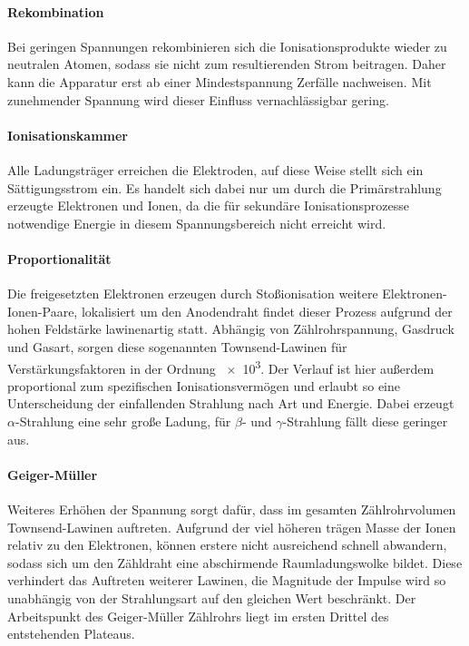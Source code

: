\paragraph{Rekombination}

Bei geringen Spannungen rekombinieren sich die Ionisationsprodukte wieder zu neutralen Atomen, sodass sie nicht zum resultierenden Strom beitragen.
Daher kann die Apparatur erst ab einer Mindestspannung Zerfälle nachweisen. Mit zunehmender Spannung wird dieser Einfluss vernachlässigbar gering.

\paragraph{Ionisationskammer}

Alle Ladungsträger erreichen die Elektroden, auf diese Weise stellt sich ein Sättigungsstrom ein. Es handelt sich dabei nur um durch die
Primärstrahlung erzeugte Elektronen und Ionen, da die für sekundäre Ionisationsprozesse notwendige Energie in diesem Spannungsbereich nicht
erreicht wird.

\paragraph{Proportionalität}

Die freigesetzten Elektronen erzeugen durch Stoßionisation weitere Elektronen-Ionen-Paare, lokalisiert um den Anodendraht findet
dieser Prozess aufgrund der hohen Feldstärke lawinenartig statt. Abhängig von Zählrohrspannung, Gasdruck und Gasart, sorgen diese
sogenannten Townsend-Lawinen für Verstärkungsfaktoren in der Ordnung \num{e3}. Der Verlauf ist hier außerdem proportional zum spezifischen
Ionisationsvermögen und erlaubt so eine Unterscheidung der einfallenden Strahlung nach Art und Energie. Dabei erzeugt $\alpha$-Strahlung eine
sehr große Ladung, für $\beta$- und $\gamma$-Strahlung fällt diese geringer aus.

\paragraph{Geiger-Müller}

Weiteres Erhöhen der Spannung sorgt dafür, dass im gesamten Zählrohrvolumen Townsend-Lawinen auftreten. Aufgrund der viel höheren trägen
Masse der Ionen relativ zu den Elektronen, können erstere nicht ausreichend schnell abwandern, sodass sich um den Zähldraht eine abschirmende
Raumladungswolke bildet. Diese verhindert das Auftreten weiterer Lawinen, die Magnitude der Impulse wird so unabhängig von der Strahlungsart
auf den gleichen Wert beschränkt. Der Arbeitspunkt des Geiger-Müller Zählrohrs liegt im ersten Drittel des entstehenden Plateaus.

